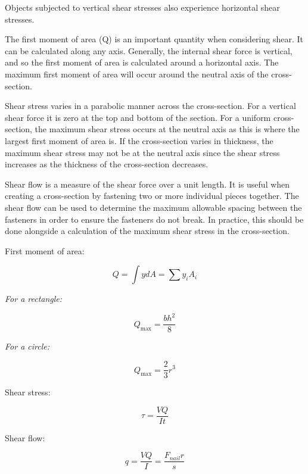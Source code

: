 \documentclass[
  letterpaper,
  DIV=11,
  numbers=noendperiod]{scrreprt}
\theoremstyle{definition}
\theoremstyle{remark}
\begin{document}
\begin{tcolorbox}[enhanced jigsaw, leftrule=.75mm, colbacktitle=quarto-callout-note-color!10!white, breakable, opacityback=0, colback=white, titlerule=0mm, toprule=.15mm, colframe=quarto-callout-note-color-frame, coltitle=black, title={Key Takeaways}, toptitle=1mm, bottomrule=.15mm, rightrule=.15mm, left=2mm, arc=.35mm, opacitybacktitle=0.6, bottomtitle=1mm]

Objects subjected to vertical shear stresses also experience horizontal
shear stresses.

The first moment of area (Q) is an important quantity when considering
shear. It can be calculated along any axis. Generally, the internal
shear force is vertical, and so the first moment of area is calculated
around a horizontal axis. The maximum first moment of area will occur
around the neutral axis of the cross-section.

Shear stress varies in a parabolic manner across the cross-section. For
a vertical shear force it is zero at the top and bottom of the section.
For a uniform cross-section, the maximum shear stress occurs at the
neutral axis as this is where the largest first moment of area is. If
the cross-section varies in thickness, the maximum shear stress may not
be at the neutral axis since the shear stress increases as the thickness
of the cross-section decreases.

Shear flow is a measure of the shear force over a unit length. It is
useful when creating a cross-section by fastening two or more individual
pieces together. The shear flow can be used to determine the maximum
allowable spacing between the fasteners in order to ensure the fasteners
do not break. In practice, this should be done alongside a calculation
of the maximum shear stress in the cross-section.

\end{tcolorbox}

\begin{tcolorbox}[enhanced jigsaw, leftrule=.75mm, colbacktitle=quarto-callout-note-color!10!white, breakable, opacityback=0, colback=white, titlerule=0mm, toprule=.15mm, colframe=quarto-callout-note-color-frame, coltitle=black, title={Key Equations}, toptitle=1mm, bottomrule=.15mm, rightrule=.15mm, left=2mm, arc=.35mm, opacitybacktitle=0.6, bottomtitle=1mm]

First moment of area:

\[
Q=\int y d A=\sum y_i A_i
\]

\emph{For a rectangle:}

\[
Q_{\max }=\frac{b h^2}{8}
\]

\emph{For a circle:}

\[
Q_{\max }=\frac{2}{3} r^3
\]

Shear stress:

\[
\tau=\frac{V Q}{I t}
\]

Shear flow:

\[
q=\frac{V Q}{I}=\frac{F_{nail} r}{s}
\]

\end{tcolorbox}
\end{document}
